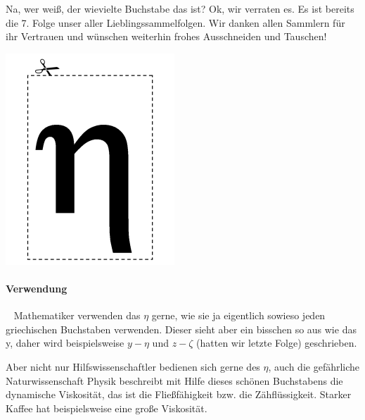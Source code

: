 {Na, wer weiß, der wievielte Buchstabe das ist? Ok, wir verraten es. Es ist
    bereits die 7. Folge unser aller Lieblingssammelfolgen. Wir danken allen
    Sammlern für ihr Vertrauen und wünschen weiterhin frohes Ausschneiden und
    Tauschen!}
{\includegraphics[width=\columnwidth]{grafik/eta}

    \paragraph{Verwendung}~\newline
    Mathematiker verwenden das $\eta$ gerne, wie sie ja eigentlich sowieso jeden
    griechischen Buchstaben verwenden. Dieser sieht aber ein bisschen so aus wie
    das y, daher wird beispielsweise $y - \eta$ und $z - \zeta$ (hatten wir letzte Folge)
    geschrieben.

    Aber nicht nur Hilfswissenschaftler bedienen sich gerne des $\eta$, auch die
    gefährliche Naturwissenschaft Physik beschreibt mit Hilfe dieses schönen
    Buchstabens die dynamische Viskosität, das ist die Fließfähigkeit bzw. die
    Zähflüssigkeit. Starker Kaffee hat beispielsweise eine große Viskosität.

}
